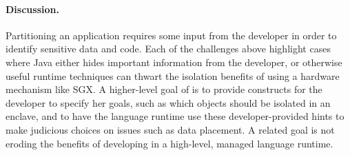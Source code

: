 
\paragraph{Discussion.}
Partitioning an application requires some input from the developer in order to identify 
sensitive data and code.  Each of the challenges above highlight cases where
Java either hides important information from the developer, or otherwise useful runtime
techniques can thwart the isolation benefits of using a hardware mechanism like SGX.
A higher-level goal of \sysname{} is to provide constructs for the developer to specify
her goals, such as which objects should be isolated in an enclave,
and to have the language runtime use these developer-provided hints to 
make judicious choices on issues such as data placement.
A related goal is not eroding the benefits of developing in a high-level, managed language runtime.


